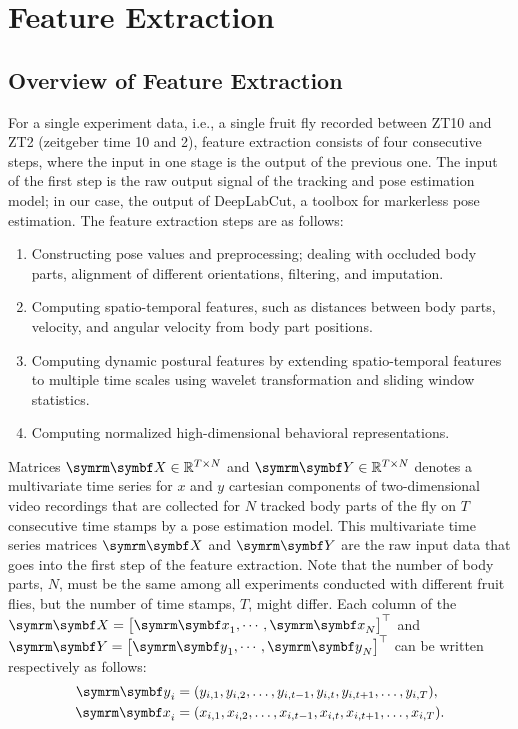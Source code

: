 \chapter{Feature Extraction}

\section{Overview of Feature Extraction}
For a single experiment data, i.e., a single fruit fly recorded between ZT10 and ZT2 (zeitgeber time 10 and 2), feature extraction consists of four consecutive steps,  where the input in one stage is the output of the previous one.
The input of the first step is the raw output signal of the tracking and pose estimation model; in our case, the output of DeepLabCut, a toolbox for markerless pose estimation.
The feature extraction steps are as follows:

\begin{enumerate}
	\item Constructing pose values and preprocessing; dealing with occluded body parts, alignment of different orientations, filtering, and imputation.
	\item Computing spatio-temporal features, such as distances between body parts, velocity, and angular velocity from body part positions.
	\item Computing dynamic postural features by extending spatio-temporal features to multiple time scales using wavelet transformation and sliding window statistics.
	\item Computing normalized high-dimensional behavioral representations.
\end{enumerate}

Matrices $\V{X} \in \mathbb{R}^{T \times N}$ and $\V{Y} \in \mathbb{R}^{T \times N}$ denotes a multivariate time series for $x$ and $y$ cartesian components of two-dimensional video recordings that are collected for $N$ tracked body parts of the fly on $T$ consecutive time stamps by a pose estimation model.
This multivariate time series matrices $\V{X}$ and $\V{Y}$ are the raw input data that goes into the first step of the feature extraction.
Note that the number of body parts, $N$, must be the same among all experiments conducted with different fruit flies, but the number of time stamps, $T$, might differ.
Each column of the $\V{X}=\qmatrix{\V{x}_1, \cdots, \V{x}_N}^\top$ and $\V{Y}=\qmatrix{\V{y}_1, \cdots, \V{y}_N}^\top$ can be written respectively as follows:
\begin{equation}
	\begin{aligned}
		\V{y}_i & = (y_{i,1}, y_{i,2}, \dots, y_{i,t-1}, y_{i,t}, y_{i,t+1}, \dots, y_{i,T}), \\
		\V{x}_i & = (x_{i,1}, x_{i,2}, \dots, x_{i,t-1}, x_{i,t}, x_{i,t+1}, \dots, x_{i,T}).
	\end{aligned}
\end{equation}


